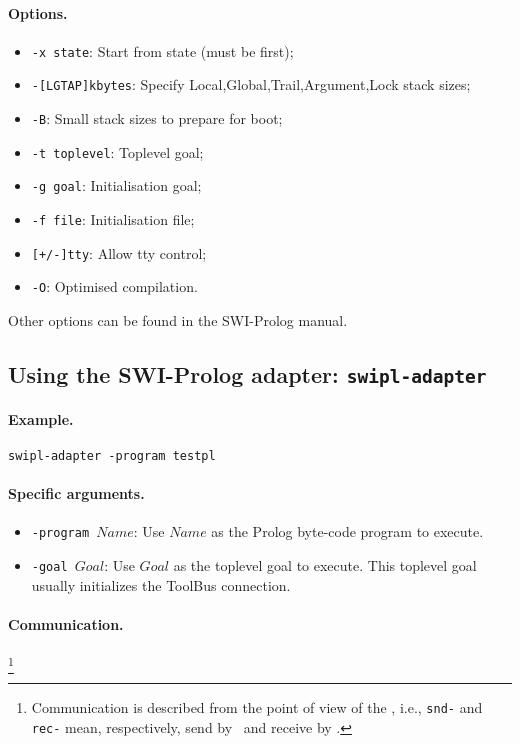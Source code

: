 {\paragraph{Options.}
\begin{itemize}
 \item {\tt -x state}: Start from state (must be first);
 \item {\tt -[LGTAP]kbytes}: Specify {Local,Global,Trail,Argument,Lock} stack sizes;
 \item {\tt -B}: Small stack sizes to prepare for boot;
 \item {\tt -t toplevel}: Toplevel goal;
 \item {\tt -g goal}: Initialisation goal;
 \item {\tt -f file}: Initialisation file;
 \item {\tt [+/-]tty}: Allow tty control;
 \item {\tt -O}: Optimised compilation.
\end{itemize}
Other options can be found in the SWI-Prolog manual.

\subsection{\label{using-swipl}Using the SWI-Prolog adapter: 
{\tt swipl-adapter}}

\paragraph{Example.} {\tt swipl-adapter -program testpl}

\paragraph{Specific arguments.}
\begin{itemize}
\item {\tt -program $Name$}: Use $Name$ as the Prolog byte-code program
to execute.
\item {\tt -goal $Goal$}: Use $Goal$ as the toplevel goal to execute.
This toplevel goal usually initializes the ToolBus connection.
\end{itemize}

\paragraph{Communication.} \hspace{-0.3cm}\footnote{Communication is described
from the point of view of the \TB, i.e., {\tt snd-} and {\tt rec-}
mean, respectively, send by \TB\ and receive by \TB.}

}
